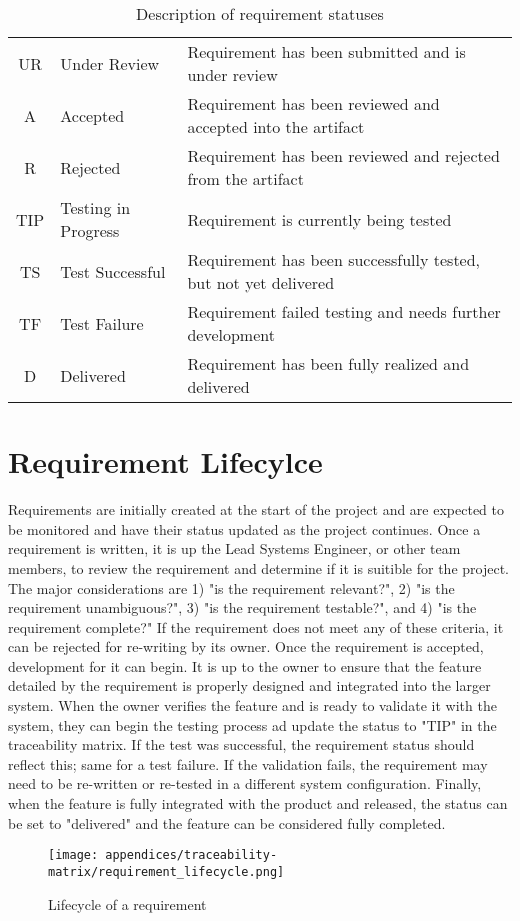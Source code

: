 \begin{table}
    \renewcommand{\arraystretch}{1.5}
    \centering
    \caption{Description of requirement statuses}
    \begin{tabular}{|c | p{} || p{}|}
        \hline
        UR  & Under Review          & Requirement has been submitted and is under review \\
        A   & Accepted              & Requirement has been reviewed and accepted into the artifact \\
        R   & Rejected              & Requirement has been reviewed and rejected from the artifact \\
        TIP & Testing in Progress   & Requirement is currently being tested \\
        TS  & Test Successful       & Requirement has been successfully tested, but not yet delivered \\
        TF  & Test Failure          & Requirement failed testing and needs further development \\
        D   & Delivered             & Requirement has been fully realized and delivered \\
        \hline
    \end{tabular}
    \label{tab:req_status}
\end{table}

\section{Requirement Lifecylce}
Requirements are initially created at the start of the project and are expected to be monitored and have their status updated as the project continues.
Once a requirement is written, it is up the Lead Systems Engineer, or other team members, to review the requirement and determine if it is suitible for the project.
The major considerations are 1) "is the requirement relevant?", 2) "is the requirement unambiguous?", 3) "is the requirement testable?", and 4) "is the requirement complete?"
If the requirement does not meet any of these criteria, it can be rejected for re-writing by its owner.
Once the requirement is accepted, development for it can begin.
It is up to the owner to ensure that the feature detailed by the requirement is properly designed and integrated into the larger system.
When the owner verifies the feature and is ready to validate it with the system, they can begin the testing process ad update the status to "TIP" in the traceability matrix.
If the test was successful, the requirement status should reflect this; same for a test failure.
If the validation fails, the requirement may need to be re-written or re-tested in a different system configuration.
Finally, when the feature is fully integrated with the product and released, the status can be set to "delivered" and the feature can be considered fully completed.

\begin{figure}
    \centering
    \caption{Lifecycle of a requirement}
    \texttt{[image: appendices/traceability-matrix/requirement\_lifecycle.png]}
    \label{fig:requirement_lifecycle}
\end{figure}
